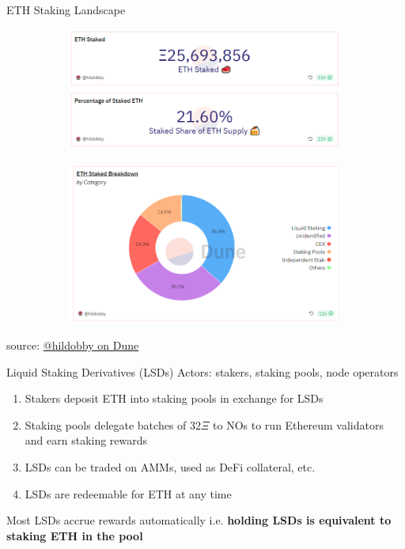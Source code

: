 \documentclass{beamer}
\begin{document}
\begin{frame}{ETH Staking Landscape}
    \begin{figure}
        \centering
        \begin{subfigure}[b]{0.45\textwidth}
            \centering
            \includegraphics[width=\textwidth]{figures/eth_stake_stats.png}
        \end{subfigure}
        \begin{subfigure}[b]{0.45\textwidth}
            \centering
            \includegraphics[width=\textwidth]{figures/eth_stake_breakdown.png}
        \end{subfigure}
    \end{figure}
    \tiny{source: \href{https://dune.com/hildobby/eth2-staking}{@hildobby on Dune}}

\end{frame}

\begin{frame}{Liquid Staking Derivatives (LSDs)}
    Actors: stakers, staking pools, node operators
    \begin{enumerate}
        \item Stakers deposit ETH into staking pools in exchange for LSDs
        \item Staking pools delegate batches of $32\Xi$ to NOs to run Ethereum validators and earn staking rewards
        \item LSDs can be traded on AMMs, used as DeFi collateral, etc.
        \item LSDs are redeemable for ETH at any time
    \end{enumerate}
    \bigskip
    Most LSDs accrue rewards automatically i.e. \textbf{holding LSDs is equivalent to staking ETH in the pool}
\end{frame}
\end{document}
